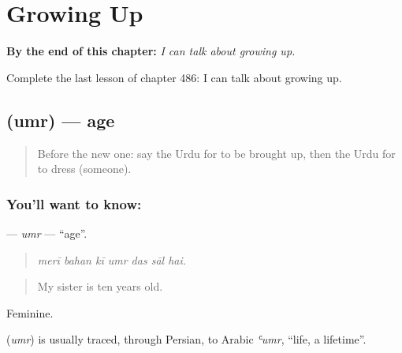 
\chapter{Growing Up}
\label{ch:ur-growing-up}

\begin{chapteropening}
\textbf{By the end of this chapter:} \emph{I can talk about growing up.}

Complete the last lesson of chapter 486: I can talk about growing up.
\end{chapteropening}

\section[\texorpdfstring{\ur{عمر} (umr)}{عمر (umr)}]{ (umr) — age}

\label{lesson:UR-C486-umr}



\begin{quote}
Before the new one: say the Urdu for to be brought up, then the Urdu for to dress (someone).
\end{quote}

\subsection*{You'll want to know: }
\textbf{} — \emph{umr} — \textquotedblleft{}age\textquotedblright{}.

\begin{quote}
      
\end{quote}

\begin{quote}
\emph{merī bahan kī umr das sāl hai.}
\end{quote}

\begin{quote}
My sister is ten years old.
\end{quote}

Feminine.

\begin{cousinweb}
\textbf{} (\emph{umr}) is usually traced, through Persian, to Arabic \emph{ʿumr}, \textquotedblleft{}life, a lifetime\textquotedblright{}.
\end{cousinweb}

